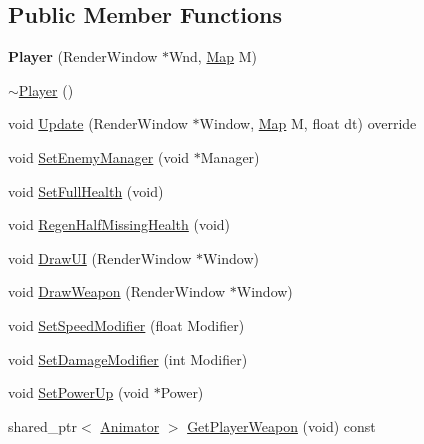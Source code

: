 \subsection*{Public Member Functions}
\begin{DoxyCompactItemize}
\item 
\mbox{\label{class_engine_1_1_game_play_1_1_player_accf9a014d2a29a17582907f6b042553b}} 
{\bfseries Player} (Render\+Window $\ast$Wnd, \hyperlink{class_engine_1_1_core_1_1_map}{Map} M)
\item 
\hyperlink{class_engine_1_1_game_play_1_1_player_a39c82fa94afe71949a7fff50fed2a4d0}{$\sim$\+Player} ()
\item 
void \hyperlink{class_engine_1_1_game_play_1_1_player_a06c682bf13c20fb2390807ec681b0121}{Update} (Render\+Window $\ast$Window, \hyperlink{class_engine_1_1_core_1_1_map}{Map} M, float dt) override
\item 
void \hyperlink{class_engine_1_1_game_play_1_1_player_adedc5552f70e5495ca1391b6f6143bec}{Set\+Enemy\+Manager} (void $\ast$Manager)
\item 
void \hyperlink{class_engine_1_1_game_play_1_1_player_a426ebc69b0607902e73563655ad66693}{Set\+Full\+Health} (void)
\item 
void \hyperlink{class_engine_1_1_game_play_1_1_player_aad2c7f9e75ef259e202be0d00924ec1d}{Regen\+Half\+Missing\+Health} (void)
\item 
void \hyperlink{class_engine_1_1_game_play_1_1_player_a4b3e08479cfc81c66eadf1e9da4a47fe}{Draw\+UI} (Render\+Window $\ast$Window)
\item 
void \hyperlink{class_engine_1_1_game_play_1_1_player_a3705c78e4c21631432c4c21a0a4e4084}{Draw\+Weapon} (Render\+Window $\ast$Window)
\item 
void \hyperlink{class_engine_1_1_game_play_1_1_player_a5a67ed64c644e9ebea338feb0db0ac98}{Set\+Speed\+Modifier} (float Modifier)
\item 
void \hyperlink{class_engine_1_1_game_play_1_1_player_a04dccb49dde0606ba440b07944abdc65}{Set\+Damage\+Modifier} (int Modifier)
\item 
void \hyperlink{class_engine_1_1_game_play_1_1_player_aa592871c49210d80e1cda615e0dee15d}{Set\+Power\+Up} (void $\ast$Power)
\item 
shared\+\_\+ptr$<$ \hyperlink{class_engine_1_1_core_1_1_animator}{Animator} $>$ \hyperlink{class_engine_1_1_game_play_1_1_player_a270ca0729136ca9105b152c5147bdbf0}{Get\+Player\+Weapon} (void) const
\end{DoxyCompactItemize}
